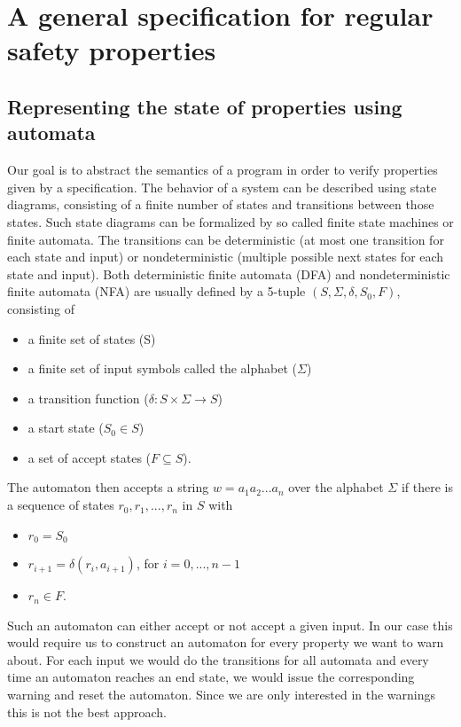 \chapter{A general specification for regular safety properties}
\section{Representing the state of properties using automata}
Our goal is to abstract the semantics of a program in order to verify properties given by a specification.
The behavior of a system can be described using state diagrams, consisting of a finite number of states and transitions between those states.
Such state diagrams can be formalized by so called finite state machines or finite automata.
The transitions can be deterministic (at most one transition for each state and input) or nondeterministic (multiple possible next states for each state and input).
Both deterministic finite automata (DFA) and nondeterministic finite automata (NFA) are usually defined by a 5-tuple $(S, \Sigma, \delta, S_0, F)$, consisting of
\begin{itemize}
\item a finite set of states (S)
\item a finite set of input symbols called the alphabet ($\Sigma$)
\item a transition function ($\delta : S \times \Sigma \rightarrow S$)
\item a start state ($S_0 \in S$)
\item a set of accept states ($F \subseteq S$).
\end{itemize}
The automaton then accepts a string $w = a_1 a_2 ... a_n$ over the alphabet $\Sigma$ if there is a sequence of states $r_0, r_1, ..., r_n$ in $S$ with
\begin{itemize}
\item $r_0 = S_0$
\item $r_{i+1} = \delta(r_i, a_{i+1})$, for $i=0, ..., n-1$
\item $r_n \in F$.
\end{itemize}
Such an automaton can either accept or not accept a given input. In our case this would require us to construct an automaton for every property we want to warn about. For each input we would do the transitions for all automata and every time an automaton reaches an end state, we would issue the corresponding warning and reset the automaton. Since we are only interested in the warnings this is not the best approach.

